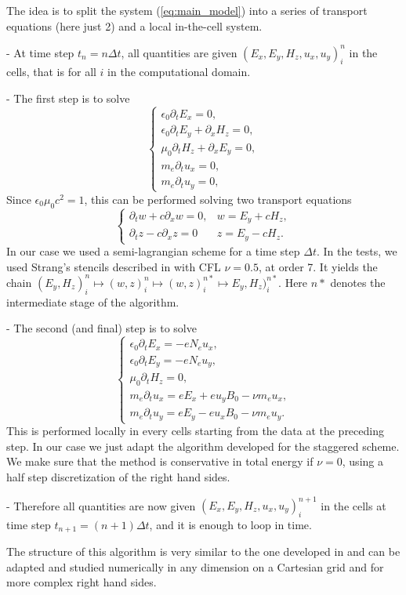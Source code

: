 The idea is to split 
the system (\ref{eq:main_model})
into a series of  transport equations (here just 2) and a local in-the-cell system. 

- At time step $t_n=n\Delta t$, all quantities are given $(E_x,E_y, H_z, u_x,u_y)_{i}^n$ in the cells, that is for all $i$ in the 
computational domain.

- The first step is to solve 
$$
\left\{
\begin{array}{lll}
\epsilon_0\partial_t E_{x}=0,\\
\epsilon_0\partial_t E_{y}+\partial_x H_z=0,\\
\mu_0\partial_t H_z+\partial_x E_y=0,\\
m_e\partial_t u_x=0,\\
m_e\partial_t u_y=0,
\end{array}
\right.
$$
Since  $\epsilon_0 \mu_0c^2=1$, this can be  performed solving
two transport equations 
$$
\left\{
\begin{array}{lll}
\partial_t w +c \partial_x w=0, & w=E_{y}+ c H_z,  \\
\partial_t z -c \partial_x z=0& z=E_{y}-  c H_z.
\end{array}
\right.
$$
In our case we used 
a semi-lagrangian scheme for a time step $\Delta t$.
In the tests, we used Strang's stencils described in \cite{cedar} with CFL $\nu=0.5$, at order 7. 
It  yields the chain 
$(E_y,H_z)_i^n\mapsto ( w,z)_i^n\mapsto ( w,z)_i^{n*}\mapsto E_y,H_z)_i^{n*} $.
Here $n*$ denotes the intermediate stage of the algorithm.

- The second (and final) step is to solve
$$
\left\{\begin{array}{l}
\epsilon_0\partial_t E_{x}=-eN_e u_x,\\
\epsilon_0\partial_t E_{y}=-eN_e u_y,\\
\mu_0\partial_t H_z=0,\\
m_e\partial_t u_x=eE_x+eu_yB_0-\nu m_e u_x,\\
m_e\partial_t u_y=eE_y-eu_xB_0-\nu m_e u_y.
\end{array}
\right.$$
This is performed locally in every cells starting from the data at the preceding 
step. In our case we just adapt the algorithm developed for the staggered scheme.
We make sure that the method is conservative in total energy if $\nu=0$, using a half step discretization
of the right hand sides.

- Therefore  all quantities are now given $(E_x,E_y, H_z, u_x,u_y)_{i}^{n+1}$ in the cells 
at time step $t_{n+1}=(n+1)\Delta t$, and it is enough to loop in time.


\begin{remark}
	The structure of this algorithm is very similar to the one developed in \cite{compfluids} and can be adapted and studied numerically
	in any dimension on a Cartesian grid and for more complex right hand sides.
\end{remark}
